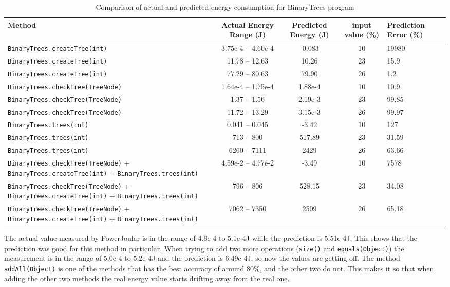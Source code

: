 \begin{table}[htbp]
  \centering
  \label{tab:energy_comparison_bin_trees}
  \footnotesize
  \begin{tabular}{>{\raggedright\arraybackslash}p{5cm}ccc}
    \toprule
    Method & Actual Energy Range (J) & Predicted Energy (J) & input value (\%) & Prediction Error (\%) \\
    \midrule
    \texttt{BinaryTrees.createTree(int)} & 3.75e-4 -- 4.60e-4 & -0.083 & 10 &  19980 \\
    \midrule
    \texttt{BinaryTrees.createTree(int)} & 11.78 -- 12.63 & 10.26 & 23 &  15.9 \\
    \midrule
    \texttt{BinaryTrees.createTree(int)} & 77.29 -- 80.63 & 79.90 & 26 &  1.2 \\
    \midrule
    \texttt{BinaryTrees.checkTree(TreeNode)} & 1.64e-4 -- 1.75e-4 & 1.88e-4 & 10 &  10.9 \\
    \midrule
    \texttt{BinaryTrees.checkTree(TreeNode)} & 1.37 -- 1.56 & 2.19e-3 & 23 &  99.85 \\
    \midrule
    \texttt{BinaryTrees.checkTree(TreeNode)} & 11.72 -- 13.29 & 3.15e-3  & 26 &  99.97 \\
    \midrule
    \texttt{BinaryTrees.trees(int)} & 0.041 -- 0.045 & -3.42 & 10 &  127 \\
    \midrule
    \texttt{BinaryTrees.trees(int)} & 713 -- 800 & 517.89 & 23 &  31.59 \\
    \midrule
    \texttt{BinaryTrees.trees(int)} & 6260 -- 7111 & 2429 & 26 &  63.66 \\
    \midrule
    \texttt{BinaryTrees.checkTree(TreeNode)} + \texttt{BinaryTrees.createTree(int)} + \texttt{BinaryTrees.trees(int)} & 4.59e-2 -- 4.77e-2 & -3.49 & 10 &  7578 \\
    \midrule
    \texttt{BinaryTrees.checkTree(TreeNode)} + \texttt{BinaryTrees.createTree(int)} + \texttt{BinaryTrees.trees(int)} & 796 -- 806 & 528.15 & 23 &  34.08 \\
    \midrule
    \texttt{BinaryTrees.checkTree(TreeNode)} + \texttt{BinaryTrees.createTree(int)} + \texttt{BinaryTrees.trees(int)} & 7062 -- 7350 & 2509 & 26 &  65.18 \\
    \bottomrule
  \end{tabular}
  \vspace{0.5em}
  \caption{Comparison of actual and predicted energy consumption for BinaryTrees program}
\end{table}


The actual value measured by PowerJoular is in the range of 4.9e-4 to 5.1e-4J while the prediction is 5.51e-4J. This shows that the prediction was good for this method in particular.
When trying to add two more operations (\texttt{size()} and \texttt{equals(Object)}) the measurement is in the range of 5.0e-4 to 5.2e-4J and the prediction is 6.49e-4J, so now the values are getting off. The method \texttt{addAll(Object)} is one of the methods that has the best accuracy of around 80\%, and the other two do not. This makes it so that when adding the other two methods the real energy value starts drifting away from the real one.

